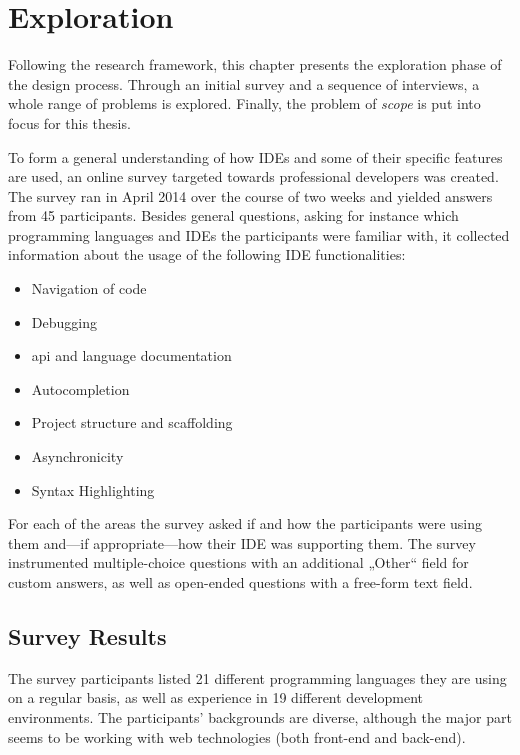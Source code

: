 \chapter{Exploration}\label{exploration}

Following the research framework, this chapter presents the exploration
phase of the design process. Through an initial survey and a sequence of
interviews, a whole range of problems is explored. Finally, the problem
of \emph{scope} is put into focus for this thesis.

To form a general understanding of how IDEs and some of their specific
features are used, an online survey targeted towards professional
developers was created. The survey ran in April 2014 over the course of
two weeks and yielded answers from 45 participants. Besides general
questions, asking for instance which programming languages and IDEs the
participants were familiar with, it collected information about the
usage of the following IDE functionalities:

\begin{itemize}
\itemsep1pt\parskip0pt
\item
  Navigation of code
\item
  Debugging
\item
  \ac{api} and language documentation
\item
  Autocompletion
\item
  Project structure and scaffolding
\item
  Asynchronicity
\item
  Syntax Highlighting
\end{itemize}

For each of the areas the survey asked if and how the participants were
using them and—if appropriate—how their IDE was supporting them. The
survey instrumented multiple-choice questions with an additional „Other“
field for custom answers, as well as open-ended questions with a
free-form text field.

\section{Survey Results}\label{survey-results}

The survey participants listed 21 different programming languages they
are using on a regular basis, as well as experience in 19 different
development environments. The participants’ backgrounds are diverse,
although the major part seems to be working with web technologies (both
front-end and back-end).

